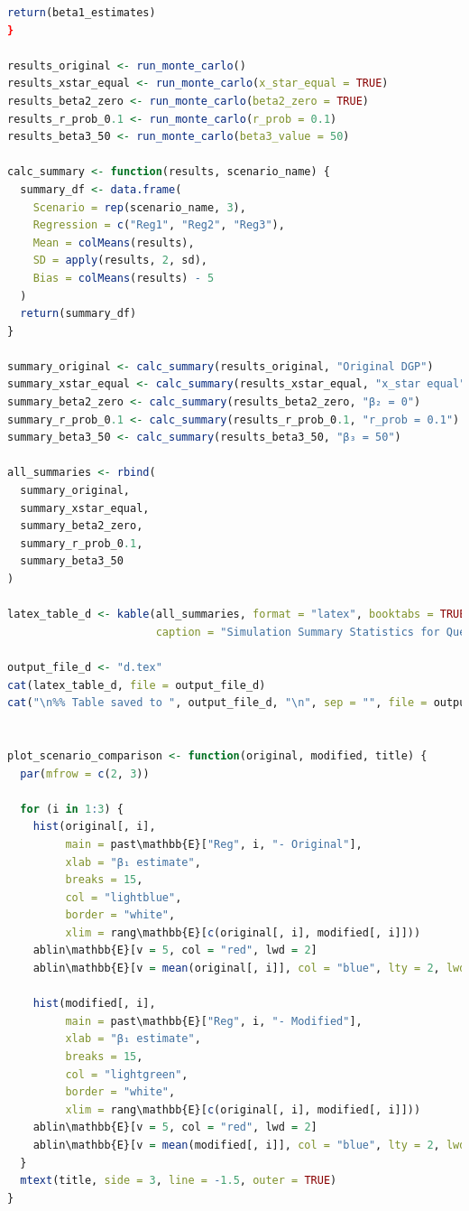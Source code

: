 \documentclass[a4paper,12pt]{article} %
\theoremstyle{nonitalic}
\newenvironment{solution}[1]
  {\renewcommand\theinnercustomsol{#1}\innercustomsol}
  {\endinnercustomsol}
\newcounter{solutionctr}
\renewcommand{\thesolutionctr}{(\alph{solutionctr})}
\newenvironment{autosolution}
  {\stepcounter{solutionctr}\begin{solution}{\thesolutionctr}}
  {\end{solution}}
\begin{document}
\begin{autosolution}
\begin{lstlisting}[language=R]
  return(beta1_estimates)
}
  
results_original <- run_monte_carlo()
results_xstar_equal <- run_monte_carlo(x_star_equal = TRUE)
results_beta2_zero <- run_monte_carlo(beta2_zero = TRUE)
results_r_prob_0.1 <- run_monte_carlo(r_prob = 0.1)
results_beta3_50 <- run_monte_carlo(beta3_value = 50)

calc_summary <- function(results, scenario_name) {
  summary_df <- data.frame(
    Scenario = rep(scenario_name, 3),
    Regression = c("Reg1", "Reg2", "Reg3"),
    Mean = colMeans(results),
    SD = apply(results, 2, sd),
    Bias = colMeans(results) - 5
  )
  return(summary_df)
}
  
summary_original <- calc_summary(results_original, "Original DGP")
summary_xstar_equal <- calc_summary(results_xstar_equal, "x_star equal")
summary_beta2_zero <- calc_summary(results_beta2_zero, "β₂ = 0")
summary_r_prob_0.1 <- calc_summary(results_r_prob_0.1, "r_prob = 0.1")
summary_beta3_50 <- calc_summary(results_beta3_50, "β₃ = 50")

all_summaries <- rbind(
  summary_original,
  summary_xstar_equal,
  summary_beta2_zero,
  summary_r_prob_0.1,
  summary_beta3_50
)
  
latex_table_d <- kable(all_summaries, format = "latex", booktabs = TRUE,
                       caption = "Simulation Summary Statistics for Question (d)")
  
output_file_d <- "d.tex"
cat(latex_table_d, file = output_file_d)
cat("\n%% Table saved to ", output_file_d, "\n", sep = "", file = output_file_d, append = TRUE)


plot_scenario_comparison <- function(original, modified, title) {
  par(mfrow = c(2, 3))
    
  for (i in 1:3) {
    hist(original[, i], 
         main = past\mathbb{E}["Reg", i, "- Original"], 
         xlab = "β₁ estimate",
         breaks = 15,
         col = "lightblue",
         border = "white",
         xlim = rang\mathbb{E}[c(original[, i], modified[, i]]))
    ablin\mathbb{E}[v = 5, col = "red", lwd = 2]
    ablin\mathbb{E}[v = mean(original[, i]], col = "blue", lty = 2, lwd = 2)
      
    hist(modified[, i], 
         main = past\mathbb{E}["Reg", i, "- Modified"], 
         xlab = "β₁ estimate",
         breaks = 15,
         col = "lightgreen",
         border = "white",
         xlim = rang\mathbb{E}[c(original[, i], modified[, i]]))
    ablin\mathbb{E}[v = 5, col = "red", lwd = 2]
    ablin\mathbb{E}[v = mean(modified[, i]], col = "blue", lty = 2, lwd = 2)
  }
  mtext(title, side = 3, line = -1.5, outer = TRUE)
}
  

\end{lstlisting}
\end{autosolution}
\end{document}

